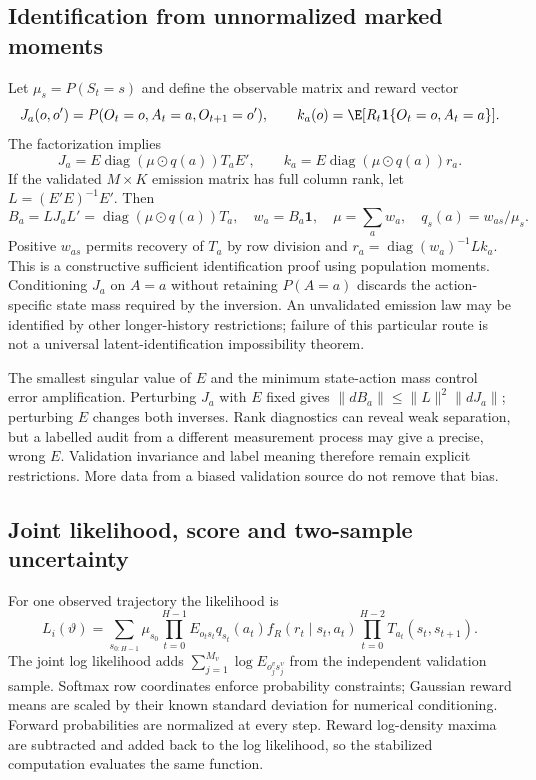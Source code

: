 \subsection{Identification from unnormalized marked moments}
Let $\mu_s=P(S_t=s)$ and define the observable matrix and reward vector
\[
 J_a(o,o')=P(O_t=o,A_t=a,O_{t+1}=o'),\qquad
 k_a(o)=\E[R_t\mathbf1\{O_t=o,A_t=a\}].
\]
The factorization implies
\[
 J_a=E\operatorname{diag}(\mu\odot q(a))T_aE',\qquad
 k_a=E\operatorname{diag}(\mu\odot q(a))r_a.
\]
If the validated $M\times K$ emission matrix has full column rank, let
$L=(E'E)^{-1}E'$. Then
\begin{equation}
 B_a=LJ_aL'=\operatorname{diag}(\mu\odot q(a))T_a,
 \quad w_a=B_a\mathbf1,\quad
 \mu=\sum_a w_a,\quad q_s(a)=w_{as}/\mu_s.
 \label{s5:marked-identification}
\end{equation}
Positive $w_{as}$ permits recovery of $T_a$ by row division and
$r_a=\operatorname{diag}(w_a)^{-1}Lk_a$. This is a constructive sufficient
identification proof using population moments. Conditioning $J_a$ on $A=a$
without retaining $P(A=a)$ discards the action-specific state mass required
by the inversion. An unvalidated emission law may be identified by other
longer-history restrictions; failure of this particular route is not a
universal latent-identification impossibility theorem.

The smallest singular value of $E$ and the minimum state-action mass control
error amplification. Perturbing $J_a$ with $E$ fixed gives
$\|dB_a\|\le\|L\|^2\|dJ_a\|$; perturbing $E$ changes both inverses.
Rank diagnostics can reveal weak separation, but a labelled audit from a
different measurement process may give a precise, wrong $E$. Validation
invariance and label meaning therefore remain explicit restrictions.
More data from a biased validation source do not remove that bias.

\subsection{Joint likelihood, score and two-sample uncertainty}
For one observed trajectory the likelihood is
\[
 L_i(\vartheta)=\sum_{s_{0:H-1}}\mu_{s_0}
 \prod_{t=0}^{H-1}E_{o_t s_t}q_{s_t}(a_t)
       f_R(r_t\mid s_t,a_t)
 \prod_{t=0}^{H-2}T_{a_t}(s_t,s_{t+1}).
\]
The joint log likelihood adds $\sum_{j=1}^{M_v}\log E_{o_j^v s_j^v}$
from the independent validation sample. Softmax row coordinates enforce
probability constraints; Gaussian reward means are scaled by their known
standard deviation for numerical conditioning. Forward probabilities are
normalized at every step. Reward log-density maxima are subtracted and
added back to the log likelihood, so the stabilized computation evaluates
the same function.


